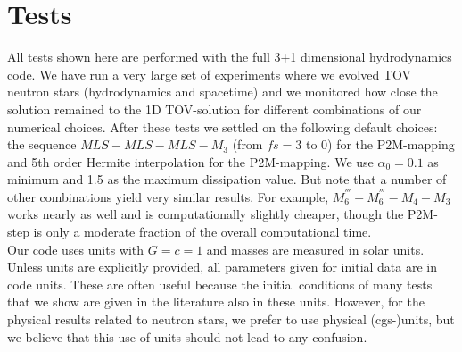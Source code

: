 \documentclass[useAMS,usenatbib]{iopart}
\begin{document}
\section{Tests}
\label{sec:tests}
All tests shown here are performed with the full 3+1 dimensional hydrodynamics code. We have
run a very large set of experiments where we evolved TOV neutron stars (hydrodynamics and spacetime) 
and we monitored how close the solution remained to the 1D TOV-solution for different combinations of our
numerical choices. After these tests we settled on the following default choices:  the sequence 
$MLS-MLS-MLS-M_3$ (from $fs=3$ to 0) for the P2M-mapping and  5th order Hermite interpolation for the
P2M-mapping.
We use $\alpha_0= 0.1$ as minimum and 1.5 as the maximum dissipation value. But note that a number of other combinations yield
very similar results. For example, $M^{'''}_6-M^{'''}_6-M_4-M_3$ works nearly as well and is computationally
slightly cheaper, though the P2M-step is only a moderate fraction of the overall computational time.\\
Our code uses units with $G=c=1$ and masses are measured in solar units.
Unless units are explicitly
provided, all parameters given for initial data are in code units.
These are often useful because the initial conditions of many tests that we
show are given in the literature also in these units. However, for the physical
results related to neutron stars, we prefer to use physical (cgs-)units, 
but we believe that this use of units should not lead to any confusion.
\end{document}
